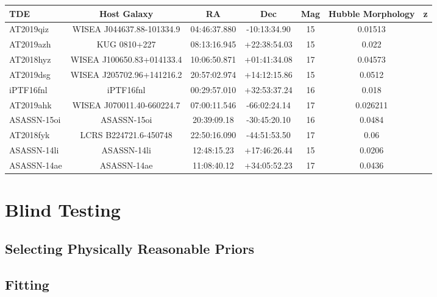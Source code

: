 \documentclass[a4paper,11pt]{article}
\begin{document}
\centering
\begin{tabular}
    {| l | c | c | c | c | c | r |}
    \hline
    TDE         & Host Galaxy               & RA           & Dec          & Mag & Hubble Morphology & z        \\
    \hline
    AT2019qiz   & WISEA J044637.88-101334.9 & 04:46:37.880 & -10:13:34.90 & 15                      & 0.01513  \\
    AT2019azh   & KUG 0810+227              & 08:13:16.945 & +22:38:54.03 & 15                      & 0.022    \\
    AT2018hyz   & WISEA J100650.83+014133.4 & 10:06:50.871 & +01:41:34.08 & 17                      & 0.04573  \\
    AT2019dsg   & WISEA J205702.96+141216.2 & 20:57:02.974 & +14:12:15.86 & 15                      & 0.0512   \\
    iPTF16fnl   & iPTF16fnl                 & 00:29:57.010 & +32:53:37.24 & 16                      & 0.018    \\
    AT2019ahk   & WISEA J070011.40-660224.7 & 07:00:11.546 & -66:02:24.14 & 17                      & 0.026211 \\
    ASASSN-15oi & ASASSN-15oi               & 20:39:09.18  & -30:45:20.10 & 16                      & 0.0484   \\
    AT2018fyk   & LCRS B224721.6-450748     & 22:50:16.090 & -44:51:53.50 & 17                      & 0.06     \\
    ASASSN-14li & ASASSN-14li               & 12:48:15.23  & +17:46:26.44 & 15                      & 0.0206   \\
    ASASSN-14ae & ASASSN-14ae               & 11:08:40.12  & +34:05:52.23 & 17                      & 0.0436   \\
    \hline
\end{tabular}

\section{Blind Testing}\label{sec:blind_testing}

\subsection{Selecting Physically Reasonable Priors}\label{sec:prior_selection}

\subsection{Fitting}\label{sec:fitting}
\end{document}
